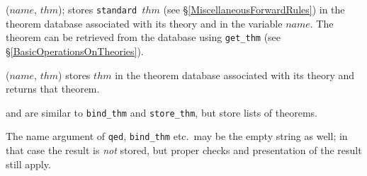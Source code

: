 \begin{ttdescription}
\item[\ttindexbold{bind_thm} ($name$, $thm$);]
  stores \texttt{standard $thm$} (see \S\ref{MiscellaneousForwardRules})
  in the theorem database associated with its theory and in the {\ML}
  variable $name$.  The theorem can be retrieved from the database
  using \texttt{get_thm} (see \S\ref{BasicOperationsOnTheories}).
  
\item[\ttindexbold{store_thm} ($name$, $thm$)]
  stores $thm$ in the theorem database associated with its theory and
  returns that theorem.
  
\item[\ttindexbold{bind_thms} \textrm{and} \ttindexbold{store_thms}] are similar to
  \texttt{bind_thm} and \texttt{store_thm}, but store lists of theorems.

\end{ttdescription}

The name argument of \texttt{qed}, \texttt{bind_thm} etc.\ may be the empty
string as well; in that case the result is \emph{not} stored, but proper
checks and presentation of the result still apply.


